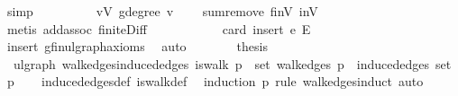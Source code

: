 \begin{isabellebody}
\ simp\isanewline
\ \ \ \ \isamarkupfalse%
\ \isamarkupfalse%
\ {\isachardoublequoteopen}{\isasymdots}\ {\isacharequal}{\kern0pt}\ {\isacharparenleft}{\kern0pt}{\isasymSum}v{\isasymin}V{\isachardot}{\kern0pt}\ g{\isachardot}{\kern0pt}degree\ v{\isacharparenright}{\kern0pt}\ {\isacharplus}{\kern0pt}\ {}{\isachardoublequoteclose}\ \isamarkupfalse%
\ sum{\isachardot}{\kern0pt}remove\ finV\ inV\ \isamarkupfalse%
\ {\isacharparenleft}{\kern0pt}metis\ add{\isachardot}{\kern0pt}assoc\ finite{\isacharunderscore}{\kern0pt}Diff{\isacharparenright}{\kern0pt}\isanewline
\ \ \ \ \isamarkupfalse%
\ \isamarkupfalse%
\ {\isachardoublequoteopen}{\isasymdots}\ {\isacharequal}{\kern0pt}\ {}\ {\isacharasterisk}{\kern0pt}\ card\ {\isacharparenleft}{\kern0pt}insert\ e\ E{\isacharprime}{\kern0pt}{\isacharparenright}{\kern0pt}{\isachardoublequoteclose}\ \isamarkupfalse%
\ insert\ g{\isachardot}{\kern0pt}fin{\isacharunderscore}{\kern0pt}ulgraph{\isacharunderscore}{\kern0pt}axioms\ \isamarkupfalse%
\ auto\isanewline
\ \ \ \ \isamarkupfalse%
\ \isamarkupfalse%
\ {\isacharquery}{\kern0pt}thesis\ \isacommand{{\isachardot}{\kern0pt}}\isamarkupfalse%
\isanewline
\ \ \isamarkupfalse%
\isanewline
{}\isamarkupfalse%
%
\endisatagproof
{\isafoldproof}%
%
\isadelimproof
%
\endisadelimproof
%
\isadelimdocument
%
\endisadelimdocument
%
\isatagdocument
%
\isamarkuptrue%
%
\endisatagdocument
{\isafolddocument}%
%
\isadelimdocument
%
\endisadelimdocument
{}\isamarkupfalse%
\ {\isacharparenleft}{\kern0pt}\ ulgraph{\isacharparenright}{\kern0pt}\ walk{\isacharunderscore}{\kern0pt}edges{\isacharunderscore}{\kern0pt}induced{\isacharunderscore}{\kern0pt}edges{\isacharcolon}{\kern0pt}\ {\isachardoublequoteopen}is{\isacharunderscore}{\kern0pt}walk\ p\ {\isasymLongrightarrow}\ set\ {\isacharparenleft}{\kern0pt}walk{\isacharunderscore}{\kern0pt}edges\ p{\isacharparenright}{\kern0pt}\ {\isasymsubseteq}\ induced{\isacharunderscore}{\kern0pt}edges\ {\isacharparenleft}{\kern0pt}set\ p{\isacharparenright}{\kern0pt}{\isachardoublequoteclose}\isanewline
%
\isadelimproof
\ \ %
\endisadelimproof
%
\isatagproof
{}\isamarkupfalse%
\ induced{\isacharunderscore}{\kern0pt}edges{\isacharunderscore}{\kern0pt}def\ is{\isacharunderscore}{\kern0pt}walk{\isacharunderscore}{\kern0pt}def\ \isamarkupfalse%
\ {\isacharparenleft}{\kern0pt}induction\ p\ rule{\isacharcolon}{\kern0pt}\ walk{\isacharunderscore}{\kern0pt}edges{\isachardot}{\kern0pt}induct{\isacharparenright}{\kern0pt}\ auto%

\end{isabellebody}
